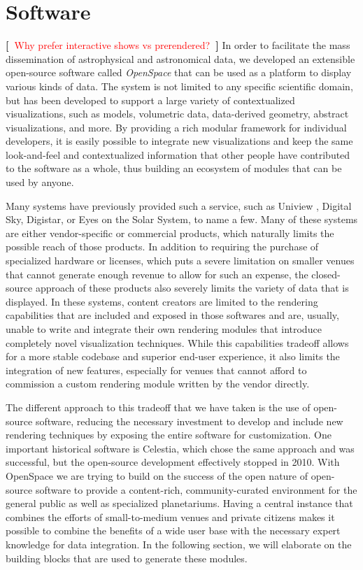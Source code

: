 \documentclass{vgtc}                %
\newcommand{\todo}[1]{\textbf{[~}\textcolor {red}{#1}\marginpar{\textcolor {red}{\centerline{{\Huge \textbf{!}}}}}\textbf{~]}}
\begin{document}
\section*{Software}
\todo{Why prefer interactive shows vs prerendered?}
In order to facilitate the mass dissemination of astrophysical and astronomical data, we developed an extensible open-source software called \emph{OpenSpace} that can be used as a platform to display various kinds of data. The system is not limited to any specific scientific domain, but has been developed to support a large variety of contextualized visualizations, such as models, volumetric data, data-derived geometry, abstract visualizations, and more. By providing a rich modular framework for individual developers, it is easily possible to integrate new visualizations and keep the same look-and-feel and contextualized information that other people have contributed to the software as a whole, thus building an ecosystem of modules that can be used by anyone.

Many systems have previously provided such a service, such as Uniview \cite{XX}, Digital Sky, Digistar, or Eyes on the Solar System, to name a few. Many of these systems are either vendor-specific or commercial products, which naturally limits the possible reach of those products. In addition to requiring the purchase of specialized hardware or licenses, which puts a severe limitation on smaller venues that cannot generate enough revenue to allow for such an expense, the closed-source approach of these products also severely limits the variety of data that is displayed. In these systems, content creators are limited to the rendering capabilities that are included and exposed in those softwares and are, usually, unable to write and integrate their own rendering modules that introduce completely novel visualization techniques. While this capabilities tradeoff allows for a more stable codebase and superior end-user experience, it also limits the integration of new features, especially for venues that cannot afford to commission a custom rendering module written by the vendor directly.

The different approach to this tradeoff that we have taken is the use of open-source software, reducing the necessary investment to develop and include new rendering techniques by exposing the entire software for customization. One important historical software is Celestia, which chose the same approach and was successful, but the open-source development effectively stopped in 2010. With OpenSpace we are trying to build on the success of the open nature of open-source software to provide a content-rich, community-curated environment for the general public as well as specialized planetariums. Having a central instance that combines the efforts of small-to-medium venues and private citizens makes it possible to combine the benefits of a wide user base with the necessary expert knowledge for data integration. In the following section, we will elaborate on the building blocks that are used to generate these modules.
\end{document}

